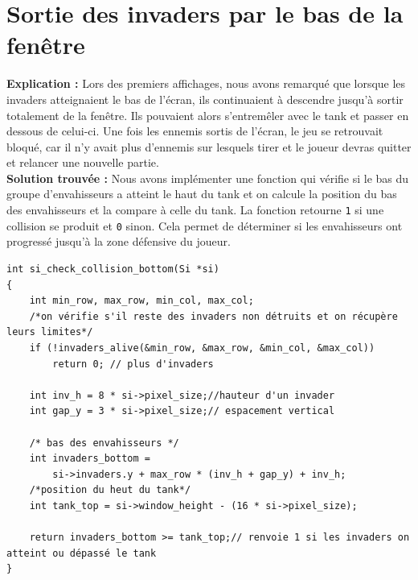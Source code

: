 \documentclass[12pt,a4paper]{report}
\begin{document}
\section{Sortie des invaders par le bas de la fenêtre  }
\textbf{Explication :} Lors des premiers affichages, nous avons remarqué que lorsque les invaders atteignaient le bas de l’écran, ils continuaient à descendre jusqu’à sortir totalement de la fenêtre. Ils pouvaient alors s’entremêler avec le tank et passer en dessous de celui-ci. Une fois les ennemis sortis de l’écran, le jeu se retrouvait bloqué, car il n’y avait plus d’ennemis sur lesquels tirer et le joueur devras quitter et relancer une nouvelle partie.
\\
\textbf{Solution trouvée :}
Nous avons implémenter une fonction qui vérifie si le bas du groupe d'envahisseurs a atteint le haut du tank et on calcule la position du bas des envahisseurs et la compare à celle du tank.  
La fonction retourne \texttt{1} si une collision se produit et \texttt{0} sinon. Cela permet de déterminer si les envahisseurs ont progressé jusqu'à la zone défensive du joueur.

\begin{lstlisting}
int si_check_collision_bottom(Si *si)
{
    int min_row, max_row, min_col, max_col;
    /*on vérifie s'il reste des invaders non détruits et on récupère leurs limites*/
    if (!invaders_alive(&min_row, &max_row, &min_col, &max_col))
        return 0; // plus d'invaders

    int inv_h = 8 * si->pixel_size;//hauteur d'un invader
    int gap_y = 3 * si->pixel_size;// espacement vertical

    /* bas des envahisseurs */
    int invaders_bottom =
        si->invaders.y + max_row * (inv_h + gap_y) + inv_h;
    /*position du heut du tank*/
    int tank_top = si->window_height - (16 * si->pixel_size);
    
    return invaders_bottom >= tank_top;// renvoie 1 si les invaders on atteint ou dépassé le tank
}

\end{lstlisting}
\end{document}

